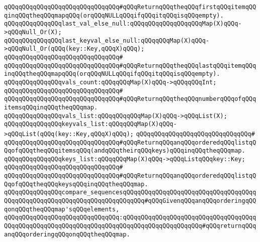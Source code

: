 \verb|qQQqqQQqqQQqqQQqqQQqqQQqqQQqqQQq#qQQqReturnqQQqtheqQQqfirstqQQqitemqQQqinqQQqtheqQQqmapqQQq(orqQQqNULLqQQqifqQQqitqQQqisqQQqempty).|\newline
\newline
\verb|qQQqqQQqqQQqqQQqlast_val_else_null:qQQqqQQqqQQqqQQqqQQqMap(X)qQQq->qQQqNull_Or(X);|\newline
\verb|qQQqqQQqqQQqqQQqlast_keyval_else_null:qQQqqQQqMap(X)qQQq->qQQqNull_Or(qQQq(key::Key,qQQqX)qQQq);|\newline
\verb|qQQqqQQqqQQqqQQqqQQqqQQqqQQqqQQq#|\newline
\verb|qQQqqQQqqQQqqQQqqQQqqQQqqQQqqQQq#qQQqReturnqQQqtheqQQqlastqQQqitemqQQqinqQQqtheqQQqmapqQQq(orqQQqNULLqQQqifqQQqitqQQqisqQQqempty).|\newline
\newline
\verb|qQQqqQQqqQQqqQQqvals_count:qQQqqQQqMap(X)qQQq->qQQqqQQqInt;|\newline
\verb|qQQqqQQqqQQqqQQqqQQqqQQqqQQqqQQq#|\newline
\verb|qQQqqQQqqQQqqQQqqQQqqQQqqQQqqQQq#qQQqReturnqQQqtheqQQqnumberqQQqofqQQqitemsqQQqinqQQqtheqQQqmap.|\newline
\newline
\verb|qQQqqQQqqQQqqQQqvals_list:qQQqqQQqqQQqMap(X)qQQq->qQQqList(X);|\newline
\verb|qQQqqQQqqQQqqQQqkeyvals_list:qQQqqQQqMap(X)qQQq->qQQqList(qQQq(key::Key,qQQqX)qQQq);|\newline
\verb|qQQqqQQqqQQqqQQqqQQqqQQqqQQqqQQq#|\newline
\verb|qQQqqQQqqQQqqQQqqQQqqQQqqQQqqQQq#qQQqReturnqQQqanqQQqorderedqQQqlistqQQqofqQQqtheqQQqitemsqQQq(andqQQqtheirqQQqkeys)qQQqinqQQqtheqQQqmap.|\newline
\newline
\verb|qQQqqQQqqQQqqQQqkeys_list:qQQqqQQqMap(X)qQQq->qQQqListqQQqkey::Key;|\newline
\verb|qQQqqQQqqQQqqQQqqQQqqQQqqQQqqQQq#|\newline
\verb|qQQqqQQqqQQqqQQqqQQqqQQqqQQqqQQq#qQQqReturnqQQqanqQQqorderedqQQqlistqQQqofqQQqtheqQQqkeysqQQqinqQQqtheqQQqmap.|\newline
\newline
\verb|qQQqqQQqqQQqqQQqcompare_sequencesqQQqqQQqqQQqqQQqqQQqqQQqqQQqqQQqqQQqqQQqqQQqqQQqqQQqqQQqqQQqqQQqqQQqqQQqqQQq#qQQqGivenqQQqanqQQqorderingqQQqonqQQqtheqQQqmap'sqQQqelements,|\newline
\verb|qQQqqQQqqQQqqQQqqQQqqQQqqQQqqQQq:qQQqqQQqqQQqqQQqqQQqqQQqqQQqqQQqqQQqqQQqqQQqqQQqqQQqqQQqqQQqqQQqqQQqqQQqqQQqqQQqqQQqqQQqqQQq#qQQqreturnqQQqanqQQqorderingqQQqonqQQqtheqQQqmap.|\newline
